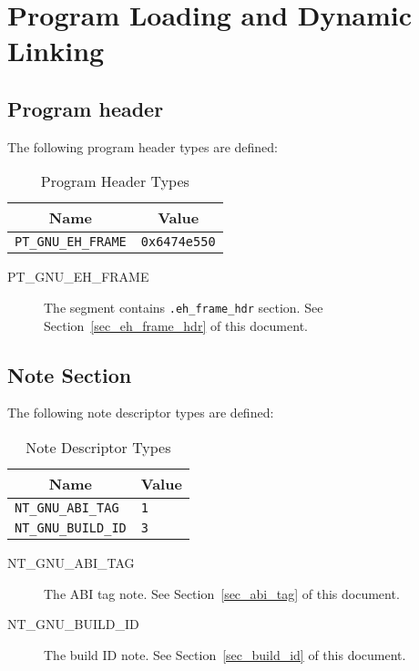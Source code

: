 \chapter{Program Loading and Dynamic Linking}

\section{Program header}

The following \xOS program header types are defined:

\begin{table}[H]
\Hrule
  \caption{Program Header Types}
  \begin{center}
    \begin{tabular}[t]{l|l}
      \multicolumn{1}{c}{Name} & \multicolumn{1}{c}{Value} \\
      \hline
      \texttt{PT_GNU_EH_FRAME} & \texttt{0x6474e550} \\
    \end{tabular}
  \end{center}
\Hrule
\end{table}

\begin{description}
 \item[PT_GNU_EH_FRAME]
      The segment contains \texttt{.eh_frame_hdr} section.  See
      Section~\ref{sec_eh_frame_hdr} of this document.
\end{description}

\section{Note Section}

The following note descriptor types are defined:

\begin{table}[H]
\Hrule
  \caption{Note Descriptor Types}
  \begin{center}
    \begin{tabular}[t]{l|l}
      \multicolumn{1}{c}{Name} & \multicolumn{1}{c}{Value} \\
      \hline
      \texttt{NT_GNU_ABI_TAG} & \texttt{1} \\
      \texttt{NT_GNU_BUILD_ID} & \texttt{3} \\
    \end{tabular}
  \end{center}
\Hrule
\end{table}

\begin{description}
 \item[NT_GNU_ABI_TAG]
   The ABI tag note.  See Section~\ref{sec_abi_tag} of this document.
 \item[NT_GNU_BUILD_ID]
   The build ID note.  See Section~\ref{sec_build_id} of this document.
\end{description}

